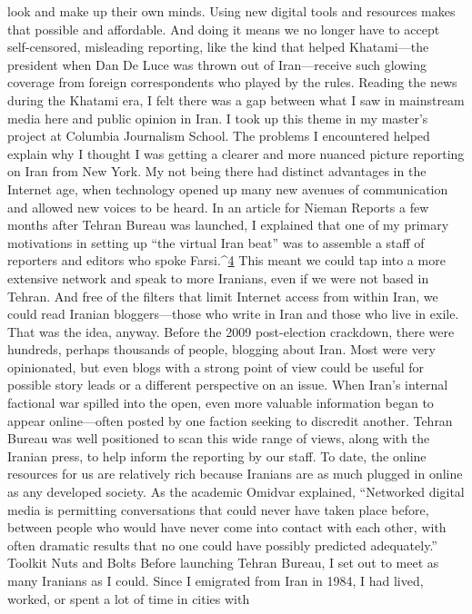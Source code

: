 look and make up their own minds.
Using new digital tools and resources makes that possible and affordable. And doing it
means we no longer have to accept self-censored, misleading reporting, like the kind that
helped Khatami—the president when Dan De Luce was thrown out of Iran—receive such
glowing coverage from foreign correspondents who played by the rules.
Reading the news during the Khatami era, I felt there was a gap between what I saw in
mainstream media here and public opinion in Iran. I took up this theme in my master’s
project at Columbia Journalism School. The problems I encountered helped explain why
I thought I was getting a clearer and more nuanced picture reporting on Iran from New
York.
My not being there had distinct advantages in the Internet age, when technology opened
up many new avenues of communication and allowed new voices to be heard. In an
article for Nieman Reports a few months after Tehran Bureau was launched, I explained
that one of my primary motivations in setting up ``the virtual Iran beat'' was to assemble a
staff of reporters and editors who spoke Farsi.^{\href{#endnotes}{4}} This meant we could tap into a more
extensive network and speak to more Iranians, even if we were not based in Tehran. And
free of the filters that limit Internet access from within Iran, we could read Iranian
bloggers—those who write in Iran and those who live in exile.
That was the idea, anyway. Before the 2009 post-election crackdown, there were
hundreds, perhaps thousands of people, blogging about Iran. Most were very opinionated,
but even blogs with a strong point of view could be useful for possible story leads or a
different perspective on an issue. When Iran’s internal factional war spilled into the open,
even more valuable information began to appear online—often posted by one faction
seeking to discredit another. Tehran Bureau was well positioned to scan this wide range
of views, along with the Iranian press, to help inform the reporting by our staff.
To date, the online resources for us are relatively rich because Iranians are as much
plugged in online as any developed society. As the academic Omidvar explained,
``Networked digital media is permitting conversations that could never have taken place
before, between people who would have never come into contact with each other, with
often dramatic results that no one could have possibly predicted adequately.''
Toolkit Nuts and Bolts
Before launching Tehran Bureau, I set out to meet as many Iranians as I could. Since I
emigrated from Iran in 1984, I had lived, worked, or spent a lot of time in cities with
